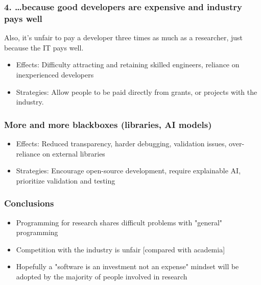 \documentclass[14pt, aspectratio=169]{beamer}
\begin{document}
\begin{frame}
\frametitle{4. \ldots because good developers are expensive and industry pays well}
Also, it's unfair to pay a developer three times as much as a researcher, just because the IT pays well.
\begin{itemize}
\item Effects: Difficulty attracting and retaining skilled engineers, reliance on inexperienced developers
\item Strategies: Allow people to be paid directly from grants, or projects with the industry. 
\end{itemize}
\end{frame}

\begin{frame}
\frametitle{More and more blackboxes (libraries, AI models)}
\begin{itemize}
\item Effects: Reduced transparency, harder debugging, validation issues, over-reliance on external libraries
\item Strategies: Encourage open-source development, require explainable AI, prioritize validation and testing
\end{itemize}
\end{frame}

\begin{frame}
\frametitle{Conclusions}
\begin{itemize}
\item Programming for research shares difficult problems with "general" programming 
\item Competition with the industry is unfair [compared with academia]
\item Hopefully a "software is an investment not an expense" mindset will be adopted by the majority of people involved in research
\end{itemize}
\end{frame}
\end{document}
